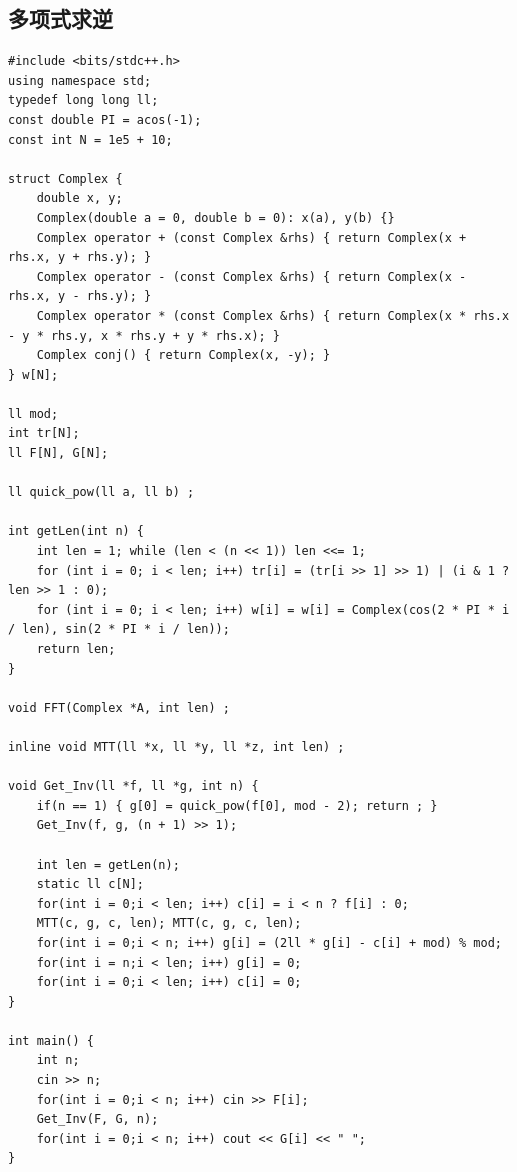 \documentclass[twoside]{article}
\begin{document}
\subsection{多项式求逆}
\begin{lstlisting}
#include <bits/stdc++.h>
using namespace std;
typedef long long ll;
const double PI = acos(-1);
const int N = 1e5 + 10;

struct Complex {
    double x, y;
    Complex(double a = 0, double b = 0): x(a), y(b) {}
    Complex operator + (const Complex &rhs) { return Complex(x + rhs.x, y + rhs.y); }
    Complex operator - (const Complex &rhs) { return Complex(x - rhs.x, y - rhs.y); }
    Complex operator * (const Complex &rhs) { return Complex(x * rhs.x - y * rhs.y, x * rhs.y + y * rhs.x); }
    Complex conj() { return Complex(x, -y); }
} w[N];

ll mod;
int tr[N];
ll F[N], G[N];

ll quick_pow(ll a, ll b) ;

int getLen(int n) {
    int len = 1; while (len < (n << 1)) len <<= 1;
    for (int i = 0; i < len; i++) tr[i] = (tr[i >> 1] >> 1) | (i & 1 ? len >> 1 : 0);
    for (int i = 0; i < len; i++) w[i] = w[i] = Complex(cos(2 * PI * i / len), sin(2 * PI * i / len));
    return len;
}

void FFT(Complex *A, int len) ;

inline void MTT(ll *x, ll *y, ll *z, int len) ;

void Get_Inv(ll *f, ll *g, int n) {
    if(n == 1) { g[0] = quick_pow(f[0], mod - 2); return ; }
    Get_Inv(f, g, (n + 1) >> 1);

    int len = getLen(n);
    static ll c[N];
    for(int i = 0;i < len; i++) c[i] = i < n ? f[i] : 0;
    MTT(c, g, c, len); MTT(c, g, c, len);
    for(int i = 0;i < n; i++) g[i] = (2ll * g[i] - c[i] + mod) % mod;
    for(int i = n;i < len; i++) g[i] = 0;
    for(int i = 0;i < len; i++) c[i] = 0;
}

int main() {
    int n;
    cin >> n;
    for(int i = 0;i < n; i++) cin >> F[i];
    Get_Inv(F, G, n);
    for(int i = 0;i < n; i++) cout << G[i] << " ";
}
\end{lstlisting}
\end{document}
